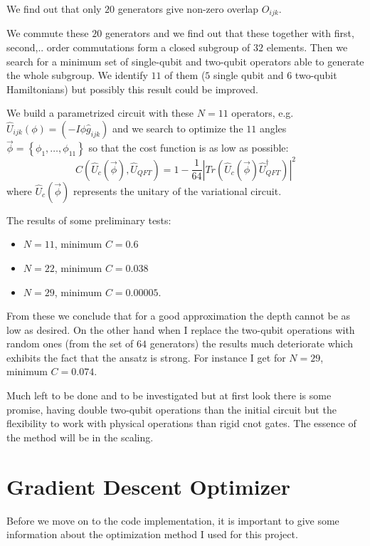 \documentclass[inscr,ack,preface]{diphdthesis}
\begin{document}
We find out that only $20$ generators give non-zero overlap $O_{ijk}$.

We commute these $20$ generators and we find out that these together with first, second,.. order commutations form
a closed subgroup of $32$ elements. Then we search for a minimum set of single-\acrshort{qubit} and two-\acrshort{qubit} operators able to generate the whole
subgroup. We identify $11$ of them ($5$ single \acrshort{qubit} and $6$ two-\acrshort{qubit} Hamiltonians) but possibly this result could be improved.

We build a parametrized circuit with these $N=11$ operators, e.g. $\hat{U}_{ijk}\left(\phi\right)=\left(-I \phi \hat{g}_{ijk}\right)$ and we search to optimize the $11$ angles $\vec{\phi}=\left\{\phi_1,\ldots, \phi_{11}\right\}$ so that the cost function is as low as possible:
\begin{equation}
C\left(\hat{U}_c\left(\vec{\phi}\right), \hat{U}_{QFT}\right)=1-\frac{1}{64}\left|Tr\left(\hat{U}_c\left(\vec{\phi}\right)\hat{U}_{QFT}^{\dagger} \right)\right|^2
\end{equation}
where $\hat{U}_c\left(\vec{\phi}\right)$ represents the unitary of the variational circuit.

The results of some preliminary tests:
\begin{itemize}
	\item $N=11$, minimum $C=0.6$
	\item $N=22$, minimum $C=0.038$
	\item $N=29$, minimum $C=0.00005$.
\end{itemize}
From these we conclude that for a good approximation the depth cannot be as low as desired.
On the other hand when I replace the two-\acrshort{qubit} operations with random ones (from the set of $64$ generators) the 
results much deteriorate which exhibits the fact that the ansatz is strong. For instance I get for $N=29$, minimum $C=0.074$.

Much left to be done and to be investigated but at first look there is some promise, having double two-\acrshort{qubit} operations
than the initial circuit but the flexibility to work with physical operations than rigid \acrshort{cnot} gates.
The essence of the method will be in the scaling.


\section{Gradient Descent Optimizer}

Before we move on to the code implementation, it is important to give some information about the optimization method I used for this project. 
\end{document}
